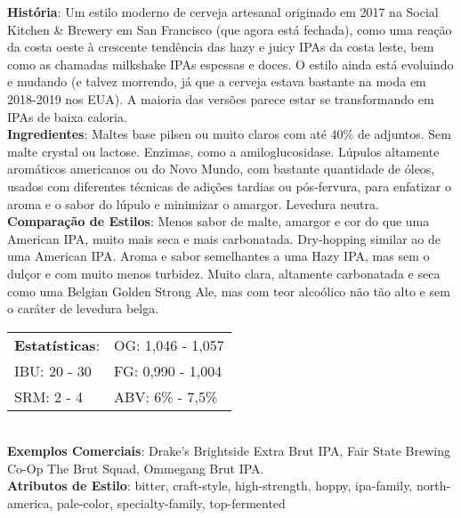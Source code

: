 \textbf{História}: Um estilo moderno de cerveja artesanal originado em 2017 na Social Kitchen \& Brewery em San Francisco (que agora está fechada), como uma reação da costa oeste à crescente tendência das hazy e juicy IPAs da costa leste, bem como as chamadas milkshake IPAs espessas e doces. O estilo ainda está evoluindo e mudando (e talvez morrendo, já que a cerveja estava bastante na moda em 2018-2019 nos EUA). A maioria das versões parece estar se transformando em IPAs de baixa caloria. \\
\textbf{Ingredientes}: Maltes base pilsen ou muito claros com até 40\% de adjuntos. Sem malte crystal ou lactose. Enzimas, como a amiloglucosidase. Lúpulos altamente aromáticos americanos ou do Novo Mundo, com bastante quantidade de óleos, usados com diferentes técnicas de adições tardias ou pós-fervura, para enfatizar o aroma e o sabor do lúpulo e minimizar o amargor. Levedura neutra. \\
\textbf{Comparação de Estilos}: Menos sabor de malte, amargor e cor do que uma American IPA, muito mais seca e mais carbonatada. Dry-hopping similar ao de uma American IPA. Aroma e sabor semelhantes a uma Hazy IPA, mas sem o dulçor e com muito menos turbidez. Muito clara, altamente carbonatada e seca como uma Belgian Golden Strong Ale, mas com teor alcoólico não tão alto e sem o caráter de levedura belga. \\
\begin{tabular}{@{}p{35mm}p{35mm}@{}}
  \textbf{Estatísticas}: & OG: 1,046 - 1,057 \\
  IBU: 20 - 30  & FG: 0,990 - 1,004 \\
  SRM: 2 - 4  & ABV: 6\% - 7,5\%
\end{tabular}\\
\textbf{Exemplos Comerciais}: Drake's Brightside Extra Brut IPA, Fair State Brewing Co-Op The Brut Squad, Ommegang Brut IPA. \\
\textbf{Atributos de Estilo}: bitter, craft-style, high-strength, hoppy, ipa-family, north-america, pale-color, specialty-family, top-fermented
